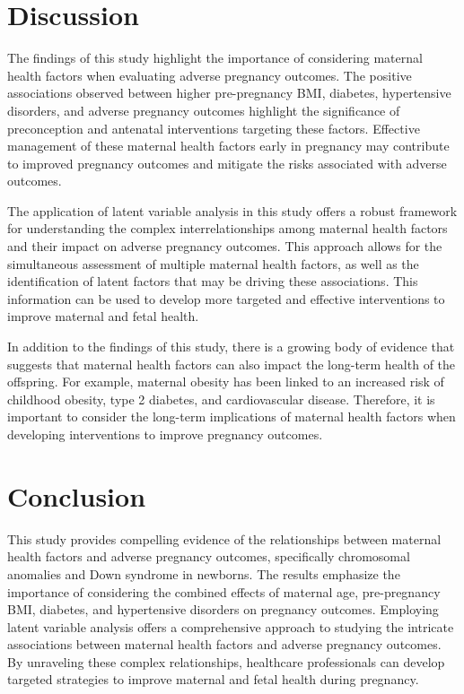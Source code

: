 \documentclass[
  letterpaper,
  DIV=11,
  numbers=noendperiod]{scrartcl}
\begin{document}
\hypertarget{discussion}{%
\section{Discussion}\label{discussion}}

The findings of this study highlight the importance of considering
maternal health factors when evaluating adverse pregnancy outcomes. The
positive associations observed between higher pre-pregnancy BMI,
diabetes, hypertensive disorders, and adverse pregnancy outcomes
highlight the significance of preconception and antenatal interventions
targeting these factors. Effective management of these maternal health
factors early in pregnancy may contribute to improved pregnancy outcomes
and mitigate the risks associated with adverse outcomes.

The application of latent variable analysis in this study offers a
robust framework for understanding the complex interrelationships among
maternal health factors and their impact on adverse pregnancy outcomes.
This approach allows for the simultaneous assessment of multiple
maternal health factors, as well as the identification of latent factors
that may be driving these associations. This information can be used to
develop more targeted and effective interventions to improve maternal
and fetal health.

In addition to the findings of this study, there is a growing body of
evidence that suggests that maternal health factors can also impact the
long-term health of the offspring. For example, maternal obesity has
been linked to an increased risk of childhood obesity, type 2 diabetes,
and cardiovascular disease. Therefore, it is important to consider the
long-term implications of maternal health factors when developing
interventions to improve pregnancy outcomes.

\hypertarget{conclusion}{%
\section{Conclusion}\label{conclusion}}

This study provides compelling evidence of the relationships between
maternal health factors and adverse pregnancy outcomes, specifically
chromosomal anomalies and Down syndrome in newborns. The results
emphasize the importance of considering the combined effects of maternal
age, pre-pregnancy BMI, diabetes, and hypertensive disorders on
pregnancy outcomes. Employing latent variable analysis offers a
comprehensive approach to studying the intricate associations between
maternal health factors and adverse pregnancy outcomes. By unraveling
these complex relationships, healthcare professionals can develop
targeted strategies to improve maternal and fetal health during
pregnancy.
\end{document}
